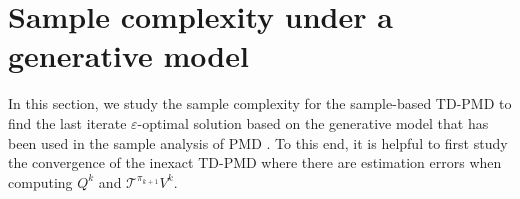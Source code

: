 \documentclass[10pt]{article}
\theoremstyle{plain}
\theoremstyle{definition}
\begin{document}
\section{Sample complexity under a generative model}
\label{sec:sample-complexity}
In this section, {we study the sample complexity for the sample-based TD-PMD to find the last iterate $\varepsilon$-optimal solution based on the generative model that has been used in the sample analysis of PMD \cite{Xiao_2022,Johnson_Pike-Burke_Rebeschini_2023,protopapas2024policy}}. To this end, it is helpful to first study the convergence of the inexact TD-PMD where there are estimation errors when computing $Q^k$ and $\mathcal{T}^{\pi_{k+1}}V^k$.
\end{document}
